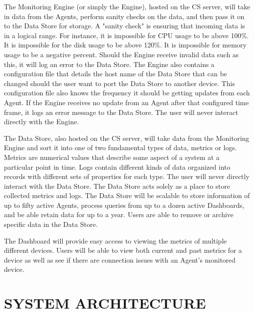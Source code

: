 \documentclass[letterpaper,12pt,oneside,listof=totoc]{scrreprt}
\begin{document}
The Monitoring Engine (or simply the Engine), hosted on the CS server, will take in data from the Agents, perform sanity checks on the data, and then pass it on to the Data Store for storage. A "sanity check" is ensuring that incoming data is in a logical range. For instance, it is impossible for CPU usage to be above 100\%. It is impossible for the disk usage to be above 120\%. It is impossible for memory usage to be a negative percent. Should the Engine receive invalid data such as this, it will log an error to the Data Store. The Engine also contains a configuration file that details the host name of the Data Store that can be changed should the user want to port the Data Store to another device. This configuration file also knows the frequency it should be getting updates from each Agent. If the Engine receives no update from an Agent after that configured time frame, it logs an error message to the Data Store. The user will never interact directly with the Engine.

The Data Store, also hosted on the CS server, will take data from the Monitoring Engine and sort it into one of two fundamental types of data, metrics or logs. Metrics are numerical values that describe some aspect of a system at a particular point in time. Logs contain different kinds of data organized into records with different sets of properties for each type. The user will never directly interact with the Data Store. The Data Store acts solely as a place to store collected metrics and logs. The Data Store will be scalable to store information of up to fifty active Agents, process queries from up to a dozen active Dashboards, and be able retain data for up to a year. Users are able to remove or archive specific data in the Data Store.

The Dashboard will provide easy access to viewing the metrics of multiple different devices. Users will be able to view both current and past metrics for a device as well as see if there are connection issues with an Agent's monitored device. 

\chapter{SYSTEM ARCHITECTURE}
\end{document}
